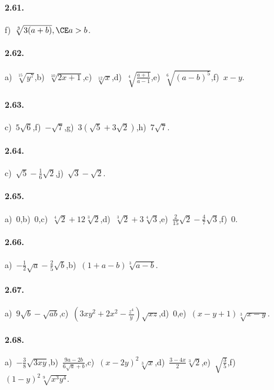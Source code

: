 \paragraph{2.61.}
f)~$\sqrt[3]{3(a+b)}, \CE a>b$.

\paragraph{2.62.}
a)~$\sqrt[15]{y^7}$,\quad b)~$\sqrt[10]{2x+1}$,\quad c)~$\sqrt[12]{x}$,\quad d)~$\sqrt[4]{\frac{a+1}{a-1}}$,\quad e)~$\sqrt[6]{(a-b)^5}$,\quad f)~$x-y$.

\paragraph{2.63.}
c)~$5\sqrt 6$,\quad f)~$-\sqrt 7$,\quad g)~$3(\sqrt 5+3\sqrt 2)$,\quad h)~$7\sqrt 7$.

\paragraph{2.64.}
c)~$\sqrt 5-\frac 1 6\sqrt 2$,\quad j)~$\sqrt 3-\sqrt 2$.

\paragraph{2.65.}
a)~$0$,\quad b)~$0$,\quad c)~$\sqrt[4]2+12\sqrt[3]2$,\quad d)~$\sqrt[3]2+3\sqrt[4]3$,\quad e)~$\frac 2{15}\sqrt 2-\frac 4 7\sqrt 3$,\quad f)~$0$.

\paragraph{2.66.}
a)~$-\frac 1 2\sqrt a-\frac 2 5\sqrt b$,\quad b)~$(1+a-b)\sqrt[3]{a-b}$.

\paragraph{2.67.}
a)~$9\sqrt b-\sqrt{ab}$,\quad c)~$\left(3xy^2+2x^2-\frac{z^4}{y}\right)\sqrt{xz}$,\quad d)~$0$,\quad e)~$(x-y+1)\sqrt[3]{x-y}$.

\paragraph{2.68.}
a)~$-\frac{3}{8}\sqrt{3xy}$,\quad b)~$\frac{9a-2b}{6\sqrt{a}+b}$,\quad c)~$(x-2y)^2\sqrt[3]{x}$,\quad d)~$\frac{3-4x}{2}\sqrt[3]{2}$,\quad e)~$\sqrt{\frac{3}{5}}$,\quad f)~$(1-y)^2\sqrt[9]{x^3y^4}$.

